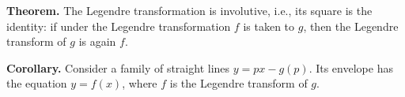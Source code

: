 \textbf{Theorem.} The Legendre transformation is involutive, i.e., its square is the identity: if under the Legendre transformation $f$ is taken to $g$, then the Legendre transform of $g$ is again $f$.

\textbf{Corollary.} Consider a family of straight lines $y = px - g(p)$. Its envelope has the equation $y = f(x)$, where $f$ is the Legendre transform of $g$.
